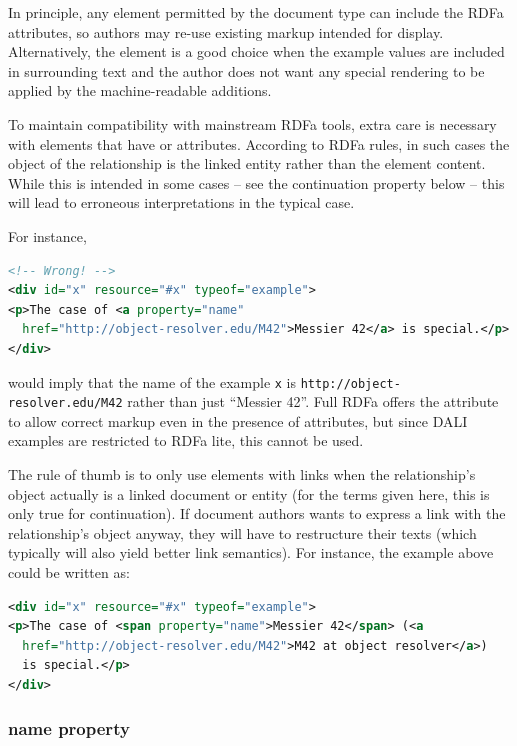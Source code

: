 \documentclass[11pt,letter]{ivoa}
\begin{document}
In principle, any element permitted by the document type can include the RDFa
attributes, so authors may re-use existing markup intended for display.
Alternatively, the  element is a good choice when the example values are
included in surrounding text and the author does not want any special rendering
to be applied by the machine-readable additions.

To maintain compatibility with mainstream RDFa tools, extra care is
necessary with elements that have  or 
attributes.  According to RDFa rules, in such cases the object of the
relationship is the linked entity rather than the element content.
While this is intended in some cases -- see the continuation property
below -- this will lead to erroneous interpretations in the typical
case.

For instance,

\begin{lstlisting}[language=XML]
<!-- Wrong! -->
<div id="x" resource="#x" typeof="example">
<p>The case of <a property="name"
  href="http://object-resolver.edu/M42">Messier 42</a> is special.</p>
</div>
\end{lstlisting}

\noindent
would imply that the name of the example \texttt{x} is
\nolinkurl{http://object-resolver.edu/M42} rather than just ``Messier
42''.  Full RDFa offers the  attribute to allow correct
markup even in the presence of  attributes, but since DALI
examples are restricted to RDFa lite, this cannot be used.

The rule of thumb is to only use elements with links when the
relationship's object actually is a linked document or entity (for the
terms given here, this is only true for continuation).  If document
authors wants to express a link with the relationship's object anyway,
they will have to restructure their texts (which typically will also
yield better link semantics).  For instance, the example above could be
written as:

\begin{lstlisting}[language=XML]
<div id="x" resource="#x" typeof="example">
<p>The case of <span property="name">Messier 42</span> (<a
  href="http://object-resolver.edu/M42">M42 at object resolver</a>)
  is special.</p>
</div>
\end{lstlisting}

\subsubsection{name property}
\end{document}
